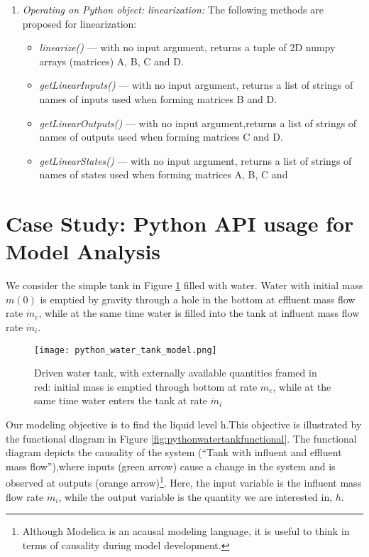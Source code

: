 \begin{enumerate}
	\item \textit{Operating on Python object: linearization:} The following methods are proposed for linearization:
	\begin{itemize}
		\item \textit{linearize()} — with no input argument, returns a tuple of 2D numpy arrays (matrices) A, B, C and D.
		\item \textit{getLinearInputs()} — with no input argument, returns a list of strings of names of inputs used when forming matrices B and D.
		\item \textit{getLinearOutputs()} — with no input argument,returns a list of strings of names of outputs used when forming matrices C and D.
		\item \textit{getLinearStates()} — with no input argument, returns a list of strings of names of states used when forming matrices A, B, C and
	\end{itemize}
\end{enumerate}

\section{Case Study: Python API usage for Model Analysis}
\label{subsec:pythoncasestudy}

We consider the simple tank in Figure \ref{fig:pythonwatertankmodel} filled with water. Water with initial mass $m(0)$ is emptied by gravity
through a hole in the bottom at effluent mass flow rate $\dot{m}_e$, while at the same time water is filled into the tank at influent mass flow rate $\dot{m}_i$.

\begin{figure}
	\texttt{[image: python\_water\_tank\_model.png]}
	\caption{Driven water tank, with externally available quantities framed	in red: initial mass is emptied through bottom at rate $\dot{m}_e $, while at the same time water enters the tank at rate $\dot{m}_i$ }
	\label{fig:pythonwatertankmodel}
\end{figure}

Our modeling objective is to find the liquid level h.This objective is illustrated by the functional diagram in
Figure \ref{fig:pythonwatertankfunctional}. The functional diagram depicts the causality of the system (“Tank with influent and effluent mass flow”),where inputs (green arrow) cause a change in the system and is observed at outputs (orange arrow)\footnote{Although Modelica is an acausal modeling language, it is useful to think in terms of causality during model development.}. Here, the input variable is the influent mass flow rate $\dot{m}_i$, while the output variable is the quantity we are interested in, $h$.

